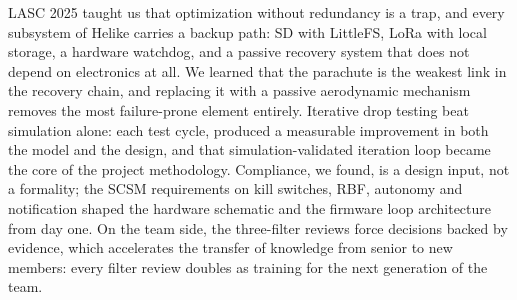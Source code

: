 LASC 2025 taught us that optimization without redundancy is a trap,
and every subsystem of Helike carries a backup path: SD with LittleFS,
LoRa with local storage, a hardware watchdog, and a passive recovery
system that does not depend on electronics at all. We learned that the
parachute is the weakest link in the recovery chain, and replacing it
with a passive aerodynamic mechanism removes the most failure-prone
element entirely. Iterative drop testing beat simulation alone: each
test cycle, produced a measurable improvement in both the model and the design, 
and that simulation-validated iteration loop became the core of the project
methodology. Compliance, we found, is a design input, not a formality;
the SCSM requirements on kill switches, RBF, autonomy and notification
shaped the hardware schematic and the firmware loop architecture from day one. On
the team side, the three-filter reviews force decisions backed by
evidence, which accelerates the transfer
of knowledge from senior to new members: every filter review doubles
as training for the next generation of the team.